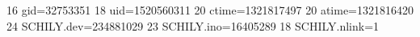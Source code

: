 16 gid=32753351
18 uid=1520560311
20 ctime=1321817497
20 atime=1321816420
24 SCHILY.dev=234881029
23 SCHILY.ino=16405289
18 SCHILY.nlink=1
